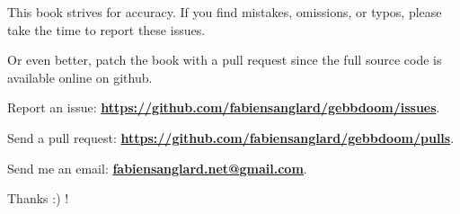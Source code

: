 This book strives for accuracy. If you find mistakes, omissions, or typos, please take the time to report these issues.\\ 
\par
Or even better, patch the book with a pull request since the full source code is available online on github.\\
\par
Report an issue: \textbf{\href{https://github.com/fabiensanglard/gebbdoom/issues}{https://github.com/fabiensanglard/gebbdoom/issues}}.\\
\par
Send a pull request: \textbf{\href{https://github.com/fabiensanglard/gebbdoom/pulls}{https://github.com/fabiensanglard/gebbdoom/pulls}}.\\
\par
Send me an email: \textbf{\href{mailto:fabiensanglard.net@gmail.com}{fabiensanglard.net@gmail.com}}.\\
\par
Thanks :) !\\
